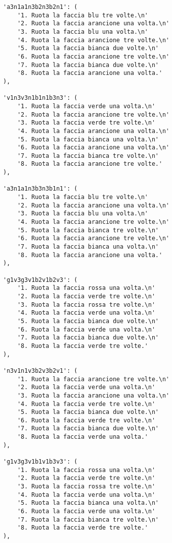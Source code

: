 \begin{lstlisting}
        'a3n1a1n3b2n3b2n1': (
            '1. Ruota la faccia blu tre volte.\n'
            '2. Ruota la faccia arancione una volta.\n'
            '3. Ruota la faccia blu una volta.\n'
            '4. Ruota la faccia arancione tre volte.\n'
            '5. Ruota la faccia bianca due volte.\n'
            '6. Ruota la faccia arancione tre volte.\n'
            '7. Ruota la faccia bianca due volte.\n'
            '8. Ruota la faccia arancione una volta.'
        ),

        'v1n3v3n1b1n1b3n3': (
            '1. Ruota la faccia verde una volta.\n'
            '2. Ruota la faccia arancione tre volte.\n'
            '3. Ruota la faccia verde tre volte.\n'
            '4. Ruota la faccia arancione una volta.\n'
            '5. Ruota la faccia bianca una volta.\n'
            '6. Ruota la faccia arancione una volta.\n'
            '7. Ruota la faccia bianca tre volte.\n'
            '8. Ruota la faccia arancione tre volte.'
        ),

        'a3n1a1n3b3n3b1n1': (
            '1. Ruota la faccia blu tre volte.\n'
            '2. Ruota la faccia arancione una volta.\n'
            '3. Ruota la faccia blu una volta.\n'
            '4. Ruota la faccia arancione tre volte.\n'
            '5. Ruota la faccia bianca tre volte.\n'
            '6. Ruota la faccia arancione tre volte.\n'
            '7. Ruota la faccia bianca una volta.\n'
            '8. Ruota la faccia arancione una volta.'
        ),

        'g1v3g3v1b2v1b2v3': (
            '1. Ruota la faccia rossa una volta.\n'
            '2. Ruota la faccia verde tre volte.\n'
            '3. Ruota la faccia rossa tre volte.\n'
            '4. Ruota la faccia verde una volta.\n'
            '5. Ruota la faccia bianca due volte.\n'
            '6. Ruota la faccia verde una volta.\n'
            '7. Ruota la faccia bianca due volte.\n'
            '8. Ruota la faccia verde tre volte.'
        ),

        'n3v1n1v3b2v3b2v1': (
            '1. Ruota la faccia arancione tre volte.\n'
            '2. Ruota la faccia verde una volta.\n'
            '3. Ruota la faccia arancione una volta.\n'
            '4. Ruota la faccia verde tre volte.\n'
            '5. Ruota la faccia bianca due volte.\n'
            '6. Ruota la faccia verde tre volte.\n'
            '7. Ruota la faccia bianca due volte.\n'
            '8. Ruota la faccia verde una volta.'
        ),

        'g1v3g3v1b1v1b3v3': (
            '1. Ruota la faccia rossa una volta.\n'
            '2. Ruota la faccia verde tre volte.\n'
            '3. Ruota la faccia rossa tre volte.\n'
            '4. Ruota la faccia verde una volta.\n'
            '5. Ruota la faccia bianca una volta.\n'
            '6. Ruota la faccia verde una volta.\n'
            '7. Ruota la faccia bianca tre volte.\n'
            '8. Ruota la faccia verde tre volte.'
        ),


\end{lstlisting}
